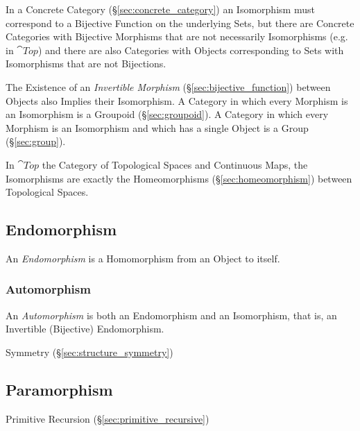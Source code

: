 In a Concrete Category (\S\ref{sec:concrete_category}) an Isomorphism
must correspond to a Bijective Function on the underlying Sets, but
there are Concrete Categories with Bijective Morphisms that are not
necessarily Isomorphisms (e.g. in $\cat{Top}$) and there are also
Categories with Objects corresponding to Sets with Isomorphisms that
are not Bijections.

The Existence of an \emph{Invertible Morphism}
(\S\ref{sec:bijective_function}) between Objects also Implies their
Isomorphism. A Category in which every Morphism is an Isomorphism is a
Groupoid (\S\ref{sec:groupoid}). A Category in which every Morphism is
an Isomorphism and which has a single Object is a Group
(\S\ref{sec:group}).

In $\cat{Top}$ the Category of Topological Spaces and Continuous
Maps, the Isomorphisms are exactly the Homeomorphisms
(\S\ref{sec:homeomorphism}) between Topological Spaces.



\subsection{Endomorphism}\label{sec:endomorphism}

An \emph{Endomorphism} is a Homomorphism from an Object to itself.



\subsubsection{Automorphism}\label{sec:automorphism}

An \emph{Automorphism} is both an Endomorphism and an Isomorphism,
that is, an Invertible (Bijective) Endomorphism.

Symmetry (\S\ref{sec:structure_symmetry})



\subsection{Paramorphism}\label{sec:paramorphism}

Primitive Recursion (\S\ref{sec:primitive_recursive})



